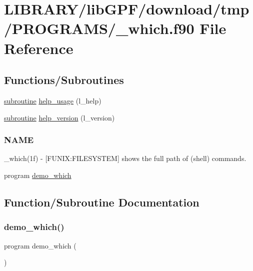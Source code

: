\hypertarget{__which_8f90}{}\section{L\+I\+B\+R\+A\+R\+Y/lib\+G\+P\+F/download/tmp/\+P\+R\+O\+G\+R\+A\+M\+S/\+\_\+which.f90 File Reference}
\label{__which_8f90}
\subsection*{Functions/\+Subroutines}
\begin{DoxyCompactItemize}
\item 
\hyperlink{M__stopwatch_83_8txt_acfbcff50169d691ff02d4a123ed70482}{subroutine} \hyperlink{__which_8f90_a3e09a3b52ee8fb04eeb93fe5761626a8}{help\+\_\+usage} (l\+\_\+help)
\item 
\hyperlink{M__stopwatch_83_8txt_acfbcff50169d691ff02d4a123ed70482}{subroutine} \hyperlink{__which_8f90_a39c21619b08a3c22f19e2306efd7f766}{help\+\_\+version} (l\+\_\+version)
\begin{DoxyCompactList}\small\item\em \subsubsection*{N\+A\+ME}

\+\_\+which(1f) -\/ \mbox{[}F\+U\+N\+IX\+:F\+I\+L\+E\+S\+Y\+S\+T\+EM\mbox{]} shows the full path of (shell) commands. \end{DoxyCompactList}\item 
program \hyperlink{__which_8f90_a33eb841ba91373377445b770f9ec6ad7}{demo\+\_\+which}
\end{DoxyCompactItemize}


\subsection{Function/\+Subroutine Documentation}
\mbox{\label{__which_8f90_a33eb841ba91373377445b770f9ec6ad7}} 
\subsubsection{\texorpdfstring{demo\+\_\+which()}{demo\_which()}}
{\footnotesize\ttfamily program demo\+\_\+which (\begin{DoxyParamCaption}{ }\end{DoxyParamCaption})}



